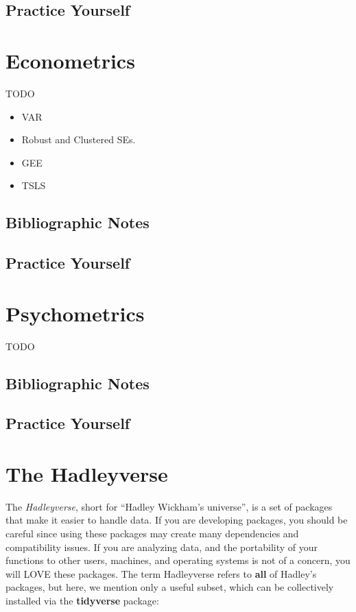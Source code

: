 \documentclass[]{book}
\providecommand{\tightlist}{%
  \setlength{\itemsep}{0pt}\setlength{\parskip}{0pt}}
\theoremstyle{definition}
\theoremstyle{definition}
\theoremstyle{definition}
\theoremstyle{remark}
\begin{document}
\section{Practice Yourself}\label{practice-yourself-16}

\chapter{Econometrics}\label{econometrics}

TODO

\begin{itemize}
\tightlist
\item
  VAR
\item
  Robust and Clustered SEs.
\item
  GEE
\item
  TSLS
\end{itemize}

\section{Bibliographic Notes}\label{bibliographic-notes-18}

\section{Practice Yourself}\label{practice-yourself-17}

\chapter{Psychometrics}\label{psychometrics}

TODO

\section{Bibliographic Notes}\label{bibliographic-notes-19}

\section{Practice Yourself}\label{practice-yourself-18}

\chapter{The Hadleyverse}\label{hadley}

The \emph{Hadleyverse}, short for ``Hadley Wickham's universe'', is a
set of packages that make it easier to handle data. If you are
developing packages, you should be careful since using these packages
may create many dependencies and compatibility issues. If you are
analyzing data, and the portability of your functions to other users,
machines, and operating systems is not of a concern, you will LOVE these
packages. The term Hadleyverse refers to \textbf{all} of Hadley's
packages, but here, we mention only a useful subset, which can be
collectively installed via the \textbf{tidyverse} package:
\end{document}
